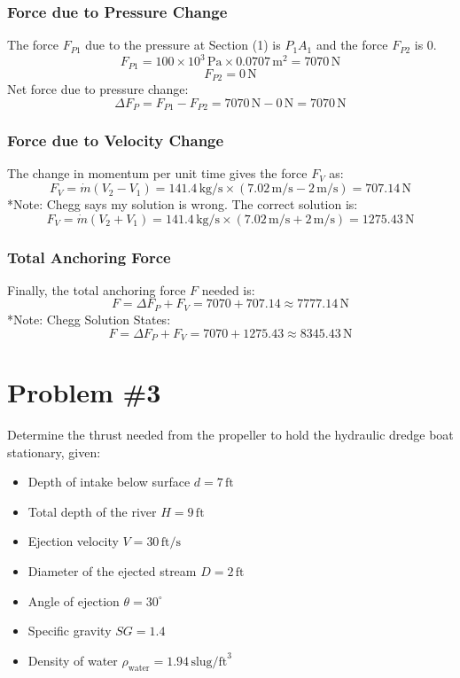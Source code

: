 \documentclass{article}
\begin{document}
\subsubsection*{Force due to Pressure Change}
The force \( F_{P1} \) due to the pressure at Section (1) is \( P_1 A_1 \) and the force \( F_{P2} \) is 0.
\[
F_{P1} = 100 \times 10^3 \, \text{Pa} \times 0.0707 \, \text{m}^2 = 7070 \, \text{N}
\]
\[
F_{P2} = 0 \, \text{N}
\]
Net force due to pressure change:
\[
\Delta F_{P} = F_{P1} - F_{P2} = 7070 \, \text{N} - 0 \, \text{N} = 7070 \, \text{N}
\]

\subsubsection*{Force due to Velocity Change}
The change in momentum per unit time gives the force \( F_{V} \) as:
\[
F_{V} = \dot{m} (V_2 - V_1) = 141.4 \, \text{kg/s} \times (7.02 \, \text{m/s} - 2 \, \text{m/s}) = 707.14 \, \text{N}
\]
*Note: Chegg says my solution is wrong. The correct solution is: 
\[
F_{V} = \dot{m} (V_2 + V_1) = 141.4 \, \text{kg/s} \times (7.02 \, \text{m/s} + 2 \, \text{m/s}) = 1275.43 \, \text{N}
\]

\subsubsection*{Total Anchoring Force}
Finally, the total anchoring force \( F \) needed is:
\[
F = \Delta F_{P} + F_{V} = 7070 + 707.14 \approx 7777.14 \, \text{N}
\]
*Note: Chegg Solution States: 
\[
F = \Delta F_{P} + F_{V} = 7070 + 1275.43 \approx 8345.43 \, \text{N}
\]





\newpage
\section*{Problem \#3}
Determine the thrust needed from the propeller to hold the hydraulic dredge boat stationary, given:
\begin{itemize}
    \item Depth of intake below surface \(d = 7 \, \text{ft}\)
    \item Total depth of the river \(H = 9 \, \text{ft}\)
    \item Ejection velocity \(V = 30 \, \text{ft/s}\)
    \item Diameter of the ejected stream \(D = 2 \, \text{ft}\)
    \item Angle of ejection \(\theta = 30^\circ\)
    \item Specific gravity \(SG = 1.4\)
    \item Density of water \(\rho_{\text{water}} = 1.94 \, \text{slug/ft}^3\)
\end{itemize}
\end{document}
